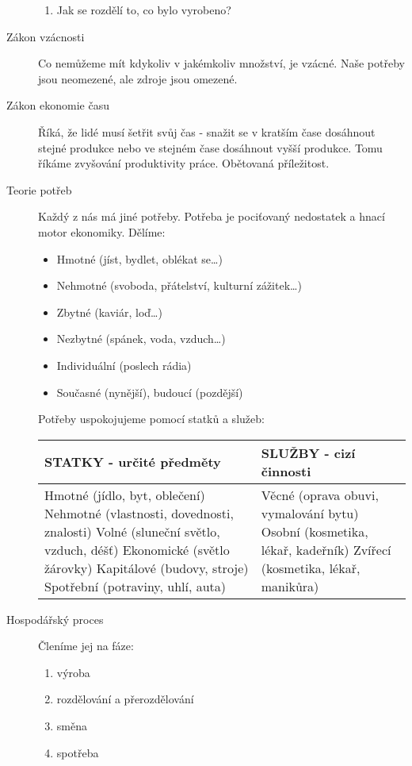 \documentclass[11pt,a4paper,twoside]{book}
\begin{document}
\begin{description}
\begin{enumerate}
			\item Jak se rozdělí to, co bylo vyrobeno?
		\end{enumerate}
		\item[Zákon vzácnosti] Co nemůžeme mít kdykoliv v jakémkoliv množství, je vzácné. Naše potřeby jsou neomezené, ale zdroje jsou omezené.
		\item[Zákon ekonomie času] Říká, že lidé musí šetřit svůj čas - snažit se v kratším čase dosáhnout stejné produkce nebo ve stejném
		čase dosáhnout vyšší produkce. Tomu říkáme zvyšování produktivity práce. Obětovaná příležitost.
		\item[Teorie potřeb] Každý z nás má jiné potřeby. Potřeba je pociťovaný nedostatek a hnací motor ekonomiky. Dělíme:
		\begin{itemize}
			\item Hmotné (jíst, bydlet, oblékat se\ldots)
			\item Nehmotné (svoboda, přátelství, kulturní zážitek\ldots)
			\item Zbytné (kaviár, loď\ldots)
			\item Nezbytné (spánek, voda, vzduch\ldots)
			\item Individuální (poslech rádia)
			\item Současné (nynější), budoucí (pozdější)
		\end{itemize}
		Potřeby uspokojujeme pomocí statků a služeb:
		
		\begin{tabular}{| p{8cm} | p{8cm} |}
			\hline
			\textbf{STATKY - určité předměty} & \textbf{SLUŽBY - cizí činnosti} \\
			\hline
			Hmotné (jídlo, byt, oblečení) \newline Nehmotné (vlastnosti, dovednosti, znalosti) \newline Volné (sluneční světlo, vzduch, déšť) \newline Ekonomické (světlo žárovky) \newline Kapitálové (budovy, stroje) \newline Spotřební (potraviny, uhlí, auta) & Věcné (oprava obuvi, vymalování bytu) \newline Osobní (kosmetika, lékař, kadeřník) \newline Zvířecí (kosmetika, lékař, manikůra) \\
			\hline
		\end{tabular}
		\item[Hospodářský proces] Členíme jej na fáze:
		\begin{enumerate}
			\item výroba
			\item rozdělování a přerozdělování
			\item směna
			\item spotřeba
		\end{enumerate}
		

\end{description}
\end{document}
